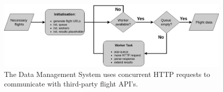 


\begin{figure}[htpb]
  \centering
  \includegraphics[width=\textwidth]{./Figures/system_implementation/dms_factory.jpg}
  \caption{The Data Management System uses concurrent HTTP requests to communicate with third-party flight API's.}
  \label{fig:dms_implementation}  
\end{figure}







